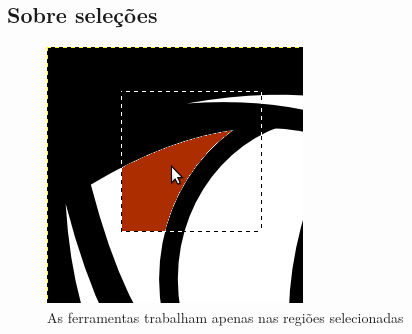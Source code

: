 \documentclass[12pt,onecolumn]{article}
\begin{document}
  \subsection{Sobre seleções}
    \begin{figure}[H]
      \centering
      \includegraphics[scale=1]{screenshots/01-selective_painting.png}
      \caption{As ferramentas trabalham apenas nas regiões selecionadas}
      \label{fig:selective_painting}
    \end{figure}
\end{document}
